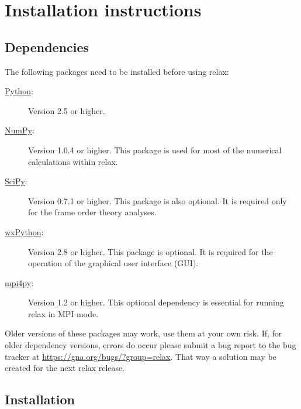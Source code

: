 
\chapter{Installation instructions}



\section{Dependencies}

The following packages need to be installed before using relax:

\begin{description}
\item[\href{http://python.org/}{Python}:]  Version 2.5 or higher.
\item[\href{http://numpy.scipy.org/}{NumPy}:]  Version 1.0.4 or higher.  This package is used for most of the numerical calculations within relax.
\item[\href{http://www.scipy.org/}{SciPy}:]  Version 0.7.1 or higher.  This package is also optional.  It is required only for the frame order theory analyses.
\item[\href{http://www.scipy.org/}{wxPython}:]  Version 2.8 or higher.  This package is optional.  It is required for the operation of the graphical user interface (GUI).
\item[\href{http://mpi4py.scipy.org/}{mpi4py}:]  Version 1.2 or higher.  This optional dependency is essential for running relax in MPI mode.
\end{description}

Older versions of these packages may work, use them at your own risk.  If, for older dependency versions, errors do occur please submit a bug report to the bug tracker at \href{https://gna.org/bugs/?group=relax}{https://gna.org/bugs/?group=relax}.  That way a solution may be created for the next relax release.




\section{Installation}



